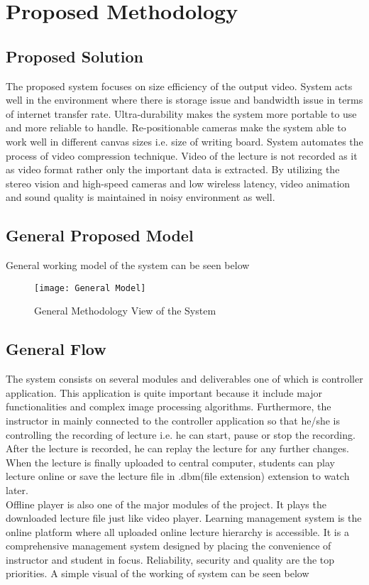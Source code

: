 
\chapter{Proposed Methodology} %
\label{Chapter3}

\section{Proposed Solution}
The proposed system focuses on size efficiency of the output video. System acts well in the environment where there is storage issue and bandwidth issue in terms of internet transfer rate. Ultra-durability makes the system more portable to use and more reliable to handle. Re-positionable cameras make the system able to work well in different canvas sizes i.e. size of writing board. System automates the process of video compression technique. Video of the lecture is not recorded as it as video format rather only the important data is extracted. By utilizing the stereo vision and high-speed cameras and low wireless latency, video animation and sound quality is maintained in noisy environment as well. 

\section{General Proposed Model}
General working model of the system can be seen below

\begin{figure}[h]
  \centering
  \texttt{[image: General Model]}
  \caption{General Methodology View of the System}
\end{figure}


\section{General Flow}
The system consists on several modules and deliverables one of which is controller application. This application is quite important because it include major functionalities and complex image processing algorithms. Furthermore, the instructor in mainly connected to the controller application so that he/she is controlling the recording of lecture i.e. he can start, pause or stop the recording. After the lecture is recorded, he can replay the lecture for any further changes. When the lecture is finally uploaded to central computer, students can play lecture online or save the lecture file in .dbm(file extension) extension to watch later.\\ Offline player is also one of the major modules of the project. It plays the downloaded lecture file just like video player. Learning management system is the online platform where all uploaded online lecture hierarchy is accessible. It is a comprehensive management system designed by placing the convenience of instructor and student in focus. Reliability, security and quality are the top priorities.
A simple visual of the working of system can be seen below
\bigskip
\bigskip

